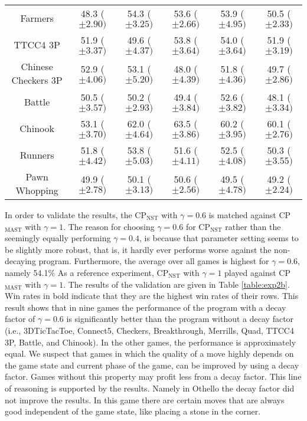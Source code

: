 \documentclass[journal]{IEEEtran}
\begin{document}
\begin{table*}[t]
\begin{tabular}{|c|c|c|c|c|c|}
\hline
Farmers & 48.3 ($\pm 2.90)$ & 54.3 ($\pm 3.25)$ & 53.6 ($\pm 2.66)$ & 53.9 ($\pm 4.95)$ & 50.5 ($\pm 2.33)$ \\ 
TTCC4 3P & 51.9 ($\pm 3.37)$ & 49.6 ($\pm 4.37)$ & 53.8 ($\pm 3.64)$ & 54.0 ($\pm 3.64)$ & 51.9 ($\pm 3.19)$ \\ 
Chinese Checkers 3P & 52.9 ($\pm 4.06)$ & 53.1 ($\pm 5.20)$ & 48.0 ($\pm 4.39)$ & 51.8 ($\pm 4.36)$ & 49.7 ($\pm 2.86)$ \\ 
\hline
Battle & 50.5 ($\pm 3.57)$ & 50.2 ($\pm 2.93)$ & 49.4 ($\pm 3.84)$ & 52.6 ($\pm 3.82)$ & 48.1 ($\pm 3.34)$ \\ 
Chinook & 53.1 ($\pm 3.70)$ & 62.0 ($\pm 4.64)$ & 63.5 ($\pm 3.86)$ & 60.2 ($\pm 3.95)$ & 60.1 ($\pm 2.76)$ \\ 
Runners & 51.8 ($\pm 4.42)$ & 53.8 ($\pm 5.03)$ & 51.6 ($\pm 4.11)$ & 52.5 ($\pm 4.08)$ & 50.3 ($\pm 3.55)$ \\ 
Pawn Whopping & 49.9 ($\pm 2.78)$ & 50.1 ($\pm 3.13)$ & 50.6 ($\pm 2.56)$ & 49.5 ($\pm 4.78)$ & 49.2 ($\pm 2.24)$ \\ \hline
\end{tabular}
\end{table*}


In order to validate the results, the CP$_{\textrm{NST}}$ with $\gamma = 0.6$ is matched against CP$_{\textrm{MAST}}$ with $\gamma = 1$. The reason for choosing $\gamma = 0.6$ for CP$_{\textrm{NST}}$ rather than the seemingly equally performing $\gamma = 0.4$, is because that parameter setting seems to be slightly more robust, that is, it hardly ever performs worse against the non-decaying program. Furthermore, the average over all games is highest for $\gamma=0.6$, namely 54.1\%
As a reference experiment, CP$_{\textrm{NST}}$ with $\gamma = 1$ played against CP$_{\textrm{MAST}}$ with $\gamma = 1$. The results of the validation are given in Table \ref{table:exp2b}. Win rates in bold indicate that they are the highest win rates of their rows. This result shows that in nine games the performance of the program with a decay factor of $\gamma = 0.6$ is significantly better than the program without a decay factor (i.e., 3DTicTacToe, Connect5, Checkers, Breakthrough, Merrills, Quad, TTCC4 3P, Battle, and Chinook). In the other games, the performance is approximately equal. We suspect that games in which the quality of a move highly depends on the game state and current phase of the game, can be improved by using a decay factor. Games without this property may profit less from a decay factor. This line of reasoning is supported by the results. Namely in Othello the decay factor did not improve the results. In this game there are certain moves that are always good independent of the game state, like placing a stone in the corner. 
\end{document}
